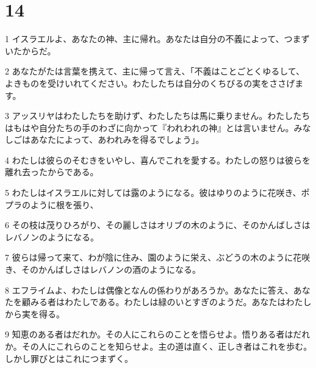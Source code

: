 \chapter{14}

\par 1 イスラエルよ、あなたの神、主に帰れ。あなたは自分の不義によって、つまずいたからだ。
\par 2 あなたがたは言葉を携えて、主に帰って言え、「不義はことごとくゆるして、よきものを受けいれてください。わたしたちは自分のくちびるの実をささげます。
\par 3 アッスリヤはわたしたちを助けず、わたしたちは馬に乗りません。わたしたちはもはや自分たちの手のわざに向かって『われわれの神』とは言いません。みなしごはあなたによって、あわれみを得るでしょう」。
\par 4 わたしは彼らのそむきをいやし、喜んでこれを愛する。わたしの怒りは彼らを離れ去ったからである。
\par 5 わたしはイスラエルに対しては露のようになる。彼はゆりのように花咲き、ポプラのように根を張り、
\par 6 その枝は茂りひろがり、その麗しさはオリブの木のように、そのかんばしさはレバノンのようになる。
\par 7 彼らは帰って来て、わが陰に住み、園のように栄え、ぶどうの木のように花咲き、そのかんばしさはレバノンの酒のようになる。
\par 8 エフライムよ、わたしは偶像となんの係わりがあろうか。あなたに答え、あなたを顧みる者はわたしである。わたしは緑のいとすぎのようだ。あなたはわたしから実を得る。
\par 9 知恵のある者はだれか。その人にこれらのことを悟らせよ。悟りある者はだれか。その人にこれらのことを知らせよ。主の道は直く、正しき者はこれを歩む。しかし罪びとはこれにつまずく。


